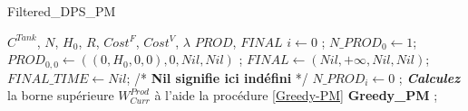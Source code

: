 \begin{algorithm}
	\caption{Filtered\_DPS\_PM}
	\label{Filtered-DPS-PRODUCTION}
	\begin{algorithmic}[1]
		\REQUIRE $C^{Tank}$, $N$, $H_0$, $R$, $Cost^F$, $Cost^V$, $\lambda$
		\ENSURE $PROD$, $FINAL$
		\hline
		\vspace{0.5cm}
		\INITIALISATION
		\STATE $i \leftarrow 0$ ; $N\_PROD_0 \leftarrow 1$; $PROD_{0, 0} \leftarrow  ((0, H_0, 0, 0), 0, Nil, Nil)$ ; 
		\STATE $FINAL \leftarrow  (Nil, + \infty, Nil, Nil)$; $FINAL\_TIME \leftarrow Nil$; /* \textbf{Nil signifie ici indéfini} */
		\STATE $N\_PROD_i \leftarrow 0$ ;
		\ENDFOR
		\STATE \textit{\textbf{Calculez}} la borne supérieure $W^{Prod}_{Curr}$ à l'aide la procédure \ref{Greedy-PM} \textbf{Greedy\_PM} ;
		
		\vspace{0.3cm}
		

\end{algorithmic}
\end{algorithm}
